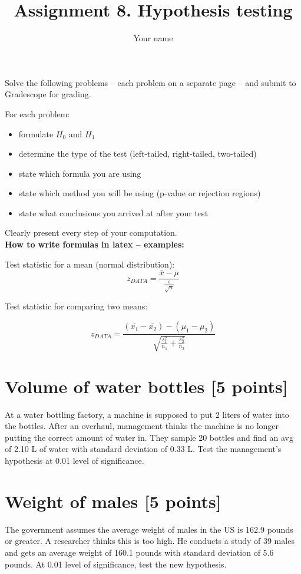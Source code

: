 \documentclass{article}
\title{Assignment 8. Hypothesis testing}
\author{Your name}
\begin{document}
\maketitle


Solve the following problems -- each problem on a separate page -- and submit to Gradescope for grading. 

For each problem: 
\begin{itemize}
\item formulate $H_0$ and $H_1$
\item determine the type of the test (left-tailed, right-tailed, two-tailed)
\item state which formula you are using 
\item state which method you will be using (p-value or rejection regions)
\item state what conclusions you arrived at after your test
\end{itemize}

Clearly present every step of your computation.\\ 

{\bf How to write formulas in latex -- examples:}

Test statistic for a mean (normal distribution):
$$z_{DATA}=\frac{\bar{x}-\mu}{\frac{s}{\sqrt{n}}}$$

Test statistic for comparing two means:

$$z_{DATA}=\frac{(\bar{x_1}-\bar{x_2}) - (\mu_1-\mu_2)}{\sqrt{\frac{s_1^2}{n_1}+\frac{s_2^2}{n_2}}}$$

\newpage
\section{Volume of water bottles [5 points]}
At a water bottling factory, a machine is supposed to put 2 liters of water into the bottles. 
After an overhaul, management thinks the machine is no longer putting the correct amount of water in. 
They sample 20 bottles and find an avg of 2.10 L of water with standard deviation of 0.33 L. 
Test the management's hypothesis at 0.01 level of significance.
\\




\newpage
\section{Weight of males [5 points]}
The government assumes the average weight of males in the US is 162.9 pounds or greater. 
A researcher thinks this is too high. 
He conducts a study of 39 males and gets an average weight of 160.1 pounds with standard deviation of 5.6 pounds. 
At 0.01 level of significance, test the new hypothesis.\\ 
\end{document}
